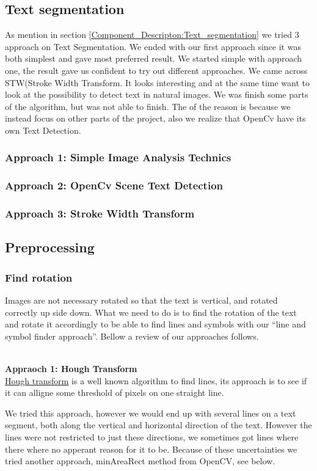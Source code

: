 \documentclass[11pt,a4paper,UKenglish]{article}
\begin{document}
\subsection{Text segmentation}
As mention in section \ref{Component_Descripton:Text_segmentation} we tried 3 approach on Text Segmentation. We ended with our first approach since it was both simplest and gave most preferred result. We started simple with approach one, the result gave us confident to try out different approaches. We came across STW(Stroke Width Transform. It looks interesting and at the same time want to look at the possibility to detect text in natural images. We was finish some parts of the algorithm, but was not able to finish. The of the reason is because we instead focus on other parts of the project, also we realize that OpenCv have its own Text Detection.

\subsubsection{Approach 1: Simple Image Analysis Technics}
\subsubsection{Approach 2: OpenCv Scene Text Detection}
\subsubsection{Approach 3: Stroke Width Transform}

\subsection{Preprocessing}
\subsubsection{Find rotation}
Images are not necessary rotated so that the text is vertical, and rotated
correctly up side down. What we need to do is to find the rotation of the text
and rotate it accordingly to be able to find lines and symbols with our
``line and symbol finder approach''. Bellow a review of our approaches follows.

\noindent \\ \textbf{Appraoch 1: Hough Transform}
\noindent \\ \href{https://en.wikipedia.org/wiki/Hough_transform}{Hough transform} is a well known algorithm to find lines, its
approach is to see if it can alligne some threshold of pixels on one straight
line. \par
We tried this approach, however we would end up with several lines on a text
segment, both along the vertical and horizontal direction of the text. However
the lines were not restricted to just these directions, we sometimes got lines
where there where no apperant reason for it to be. Because of these
uncertainties we tried another approach, minAreaRect method from OpenCV, see
below.
\end{document}
